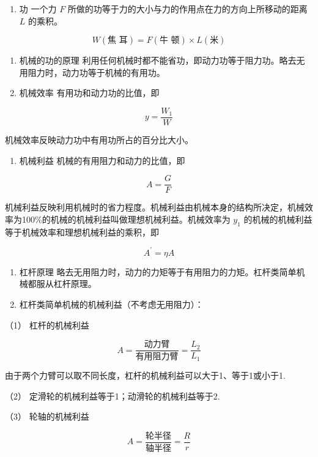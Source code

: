 \begin{enumerate}
\def\labelenumi{\arabic{enumi}.}
\tightlist
\item
  功 一个力 \(F\)
  所做的功等于力的大小与力的作用点在力的方向上所移动的距离 \(L\)
  的乘积。
\end{enumerate}

\[
W (\text{焦 耳}) = F (\text{牛 顿}) \times L (\text{米})
\]

\begin{enumerate}
\def\labelenumi{\arabic{enumi}.}
\setcounter{enumi}{1}
\item
  机械的功的原理
  利用任何机械时都不能省功，即动力功等于阻力功。略去无用阻力时，动力功等于机械的有用功。
\item
  机械效率 有用功和动力功的比值，即
\end{enumerate}

\[
y = \frac {W _ {1}}{W}
\]

机械效率反映动力功中有用功所占的百分比大小。

\begin{enumerate}
\def\labelenumi{\arabic{enumi}.}
\setcounter{enumi}{3}
\tightlist
\item
  机械利益 机械的有用阻力和动力的比值，即
\end{enumerate}

\[
A = \frac {G}{F}
\]

机械利益反映利用机械时的省力程度。机械利益由机械本身的结构所决定，机械效率为100\%的机械的机械利益叫做理想机械利益。机械效率为
\(y_{1}\) 的机械的机械利益等于机械效率和理想机械利益的乘积，即

\[
A ^ {\prime} = \eta A
\]

\begin{enumerate}
\def\labelenumi{\arabic{enumi}.}
\setcounter{enumi}{4}
\item
  杠杆原理
  略去无用阻力时，动力的力矩等于有用阻力的力矩。杠杆类简单机械都服从杠杆原理。
\item
  杠杆类简单机械的机械利益（不考虑无用阻力）：
\end{enumerate}

（1） 杠杆的机械利益

\[
A = \frac {\text{动力臂}}{\text{有用阻力臂}} = \frac {L _ {2}}{L _ {1}}
\]

由于两个力臂可以取不同长度，杠杆的机械利益可以大于1、等于1或小于1.

（2） 定滑轮的机械利益等于1；动滑轮的机械利益等于2.

（3） 轮轴的机械利益

\[
A = \frac {\text{轮半径}}{\text{轴半径}} = \frac {R}{r}
\]

